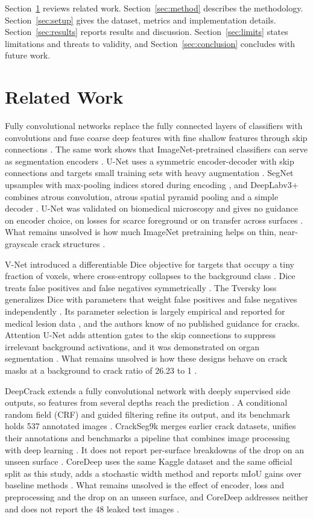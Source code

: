 \documentclass[conference]{IEEEtran}
\begin{document}
Section~\ref{sec:related} reviews related work. Section~\ref{sec:method} describes the methodology. Section~\ref{sec:setup} gives the dataset, metrics and implementation details. Section~\ref{sec:results} reports results and discussion. Section~\ref{sec:limits} states limitations and threats to validity, and Section~\ref{sec:conclusion} concludes with future work.

\section{Related Work}
\label{sec:related}
Fully convolutional networks replace the fully connected layers of classifiers with convolutions and fuse coarse deep features with fine shallow features through skip connections \cite{fcn}. The same work shows that ImageNet-pretrained classifiers can serve as segmentation encoders \cite{fcn}. U-Net uses a symmetric encoder-decoder with skip connections and targets small training sets with heavy augmentation \cite{unet}. SegNet upsamples with max-pooling indices stored during encoding \cite{segnet}, and DeepLabv3+ combines atrous convolution, atrous spatial pyramid pooling and a simple decoder \cite{deeplab}. U-Net was validated on biomedical microscopy and gives no guidance on encoder choice, on losses for scarce foreground or on transfer across surfaces \cite{unet}. What remains unsolved is how much ImageNet pretraining helps on thin, near-grayscale crack structures \cite{fcn,unet}.

V-Net introduced a differentiable Dice objective for targets that occupy a tiny fraction of voxels, where cross-entropy collapses to the background class \cite{vnet}. Dice treats false positives and false negatives symmetrically \cite{vnet,tversky}. The Tversky loss generalizes Dice with parameters that weight false positives and false negatives independently \cite{tversky}. Its parameter selection is largely empirical and reported for medical lesion data \cite{tversky}, and the authors know of no published guidance for cracks. Attention U-Net adds attention gates to the skip connections to suppress irrelevant background activations, and it was demonstrated on organ segmentation \cite{attnunet}. What remains unsolved is how these designs behave on crack masks at a background to crack ratio of 26.23 to 1 \cite{vnet,tversky,attnunet}.

DeepCrack extends a fully convolutional network with deeply supervised side outputs, so features from several depths reach the prediction \cite{deepcrack}. A conditional random field (CRF) and guided filtering refine its output, and its benchmark holds 537 annotated images \cite{deepcrack}. CrackSeg9k merges earlier crack datasets, unifies their annotations and benchmarks a pipeline that combines image processing with deep learning \cite{crackseg9k}. It does not report per-surface breakdowns of the drop on an unseen surface \cite{crackseg9k}. CoreDeep uses the same Kaggle dataset and the same official split as this study, adds a stochastic width method and reports mIoU gains over baseline methods \cite{coredeep}. What remains unsolved is the effect of encoder, loss and preprocessing and the drop on an unseen surface, and CoreDeep addresses neither and does not report the 48 leaked test images \cite{coredeep}.
\end{document}
